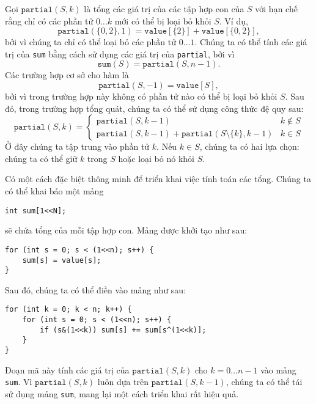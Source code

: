 Gọi $\texttt{partial}(S,k)$ là tổng các
giá trị của các tập hợp con của $S$ với hạn chế
rằng chỉ có các phần tử $0 \ldots k$
mới có thể bị loại bỏ khỏi $S$.
Ví dụ,
\[\texttt{partial}(\{0,2\},1)=\texttt{value}[\{2\}]+\texttt{value}[\{0,2\}],\]
bởi vì chúng ta chỉ có thể loại bỏ các phần tử $0 \ldots 1$.
Chúng ta có thể tính các giá trị của \texttt{sum} bằng cách sử dụng
các giá trị của \texttt{partial}, bởi vì
\[\texttt{sum}(S) = \texttt{partial}(S,n-1).\]
Các trường hợp cơ sở cho hàm là
\[\texttt{partial}(S,-1)=\texttt{value}[S],\]
bởi vì trong trường hợp này không có phần tử nào có thể bị loại bỏ khỏi $S$.
Sau đó, trong trường hợp tổng quát, chúng ta có thể sử dụng công thức đệ quy sau:
\begin{equation*}
    \texttt{partial}(S,k) = \begin{cases}
               \texttt{partial}(S,k-1) & k \notin S \\
               \texttt{partial}(S,k-1) + \texttt{partial}(S \setminus \{k\},k-1) & k \in S
           \end{cases}
\end{equation*}
Ở đây chúng ta tập trung vào phần tử $k$.
Nếu $k \in S$, chúng ta có hai lựa chọn: chúng ta có thể giữ $k$ trong $S$
hoặc loại bỏ nó khỏi $S$.

Có một cách đặc biệt thông minh để triển khai việc
tính toán các tổng. Chúng ta có thể khai báo một mảng
\begin{lstlisting}
int sum[1<<N];
\end{lstlisting}
sẽ chứa tổng của mỗi tập hợp con.
Mảng được khởi tạo như sau:
\begin{lstlisting}
for (int s = 0; s < (1<<n); s++) {
    sum[s] = value[s];
}
\end{lstlisting}
Sau đó, chúng ta có thể điền vào mảng như sau:
\begin{lstlisting}
for (int k = 0; k < n; k++) {
    for (int s = 0; s < (1<<n); s++) {
        if (s&(1<<k)) sum[s] += sum[s^(1<<k)];
    }
}
\end{lstlisting}
Đoạn mã này tính các giá trị của $\texttt{partial}(S,k)$
cho $k=0 \ldots n-1$ vào mảng \texttt{sum}.
Vì $\texttt{partial}(S,k)$ luôn dựa trên
$\texttt{partial}(S,k-1)$, chúng ta có thể tái sử dụng mảng
\texttt{sum}, mang lại một cách triển khai rất hiệu quả.